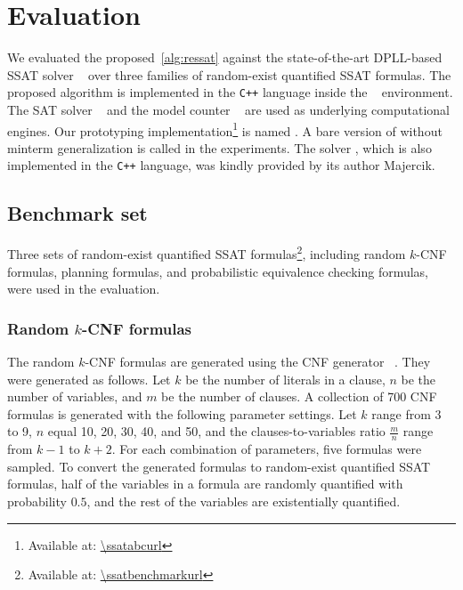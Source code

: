\section{Evaluation}
\label{sect:ressat-evaluation}

We evaluated the proposed~\cref{alg:ressat} against
the state-of-the-art DPLL-based SSAT solver \dcssat~\cite{Majercik2005}
over three families of random-exist quantified SSAT formulas.
The proposed algorithm is implemented in the \texttt{C++} language inside the \abc~\cite{ABC} environment.
The SAT solver ~\cite{Een2003Solver}
and the model counter \cachet~\cite{Sang2004}
are used as underlying computational engines.
Our prototyping implementation\footnote{Available at: \url{\ssatabcurl}} is named \ressat.
A bare version of \ressat without minterm generalization is called \ressatb in the experiments.
The solver \dcssat,
which is also implemented in the \texttt{C++} language,
was kindly provided by its author Majercik.

\subsection{Benchmark set}
Three sets of random-exist quantified SSAT formulas\footnote{Available at: \url{\ssatbenchmarkurl}},
including random $k$-CNF formulas,
planning formulas,
and probabilistic equivalence checking formulas,
were used in the evaluation.

\subsubsection{Random $k$-CNF formulas}
The random $k$-CNF formulas are generated using the CNF generator \cnfgen~\cite{Lauria2017CNFgen}.
They were generated as follows.
Let $k$ be the number of literals in a clause,
$n$ be the number of variables,
and $m$ be the number of clauses.
A collection of 700 CNF formulas is generated with the following parameter settings.
Let $k$ range from 3 to 9,
$n$ equal 10, 20, 30, 40, and 50,
and the clauses-to-variables ratio $\frac{m}{n}$ range from $k-1$ to $k+2$.
For each combination of parameters,
five formulas were sampled.
To convert the generated formulas to random-exist quantified SSAT formulas,
half of the variables in a formula are randomly quantified with probability $0.5$,
and the rest of the variables are existentially quantified.

